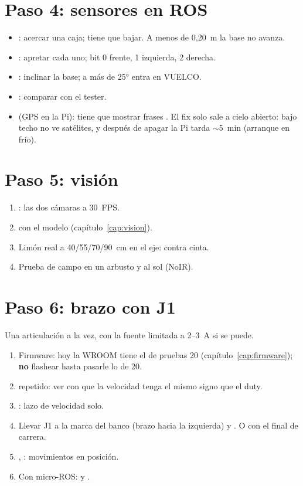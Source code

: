 \section{Paso 4: sensores en ROS}
\begin{itemize}
  \item {}: acercar una caja; tiene que bajar. A menos de 0,20~m la base no avanza.
  \item {}: apretar cada uno; bit 0 frente, 1 izquierda, 2 derecha.
  \item {}: inclinar la base; a más de 25° entra en VUELCO.
  \item {}: comparar con el tester.
  \item {} (GPS en la Pi):  tiene que mostrar frases . El fix
        solo sale a cielo abierto: bajo techo no ve satélites, y después de apagar la Pi tarda $\sim$5~min (arranque en frío).
\end{itemize}

\section{Paso 5: visión}
\begin{enumerate}
  \item {}: las dos cámaras a 30~FPS.
  \item {} con el modelo (capítulo~\ref{cap:vision}).
  \item Limón real a 40/55/70/90~cm en el eje:  contra cinta.
  \item Prueba de campo en un arbusto y al sol (NoIR).
\end{enumerate}

\section{Paso 6: brazo con J1}
Una articulación a la vez, con la fuente limitada a 2--3~A si se puede.
\begin{enumerate}
  \item Firmware: hoy la WROOM tiene el de pruebas 20 (capítulo~\ref{cap:firmware}); \textbf{no} flashear
         hasta pasarle lo de 20.
  \item {} repetido: ver con  que la velocidad tenga el mismo signo que el duty.
  \item {}: lazo de velocidad solo.
  \item Llevar J1 a la marca del banco (brazo hacia la izquierda) y . O  con el final de carrera.
  \item {}, : movimientos en posición.
  \item Con micro-ROS:  y .
\end{enumerate}

